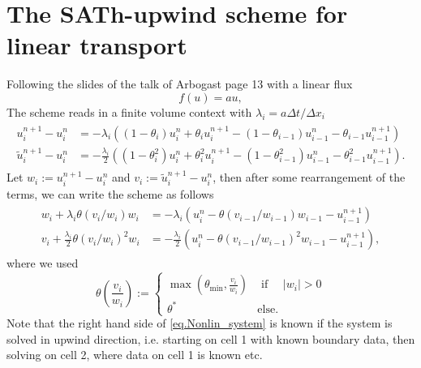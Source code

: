 \documentclass[3p]{scrartcl}%
\begin{document}
    \section{The SATh-upwind scheme for linear transport}
    Following the slides of the talk of Arbogast page 13 with a linear flux
    \begin{equation}
        f(u) = a u,
    \end{equation}
    The scheme reads in a finite volume context with $\lambda_i = a\Delta t/\Delta x_i$
    \begin{align}
\begin{split}
            u_i^{n+1} - u_i^n &= - \lambda_i \left((1-\theta_i) u_i^n + \theta_i u_i^{n+1} - (1-\theta_{i-1})u_{i-1}^n - \theta_{i-1} u_{i-1}^{n+1}\right) \\
        \tilde u_i^{n+1} - u_i^n &= - \frac{\lambda_i}{2} \left((1-\theta_i^2) u_i^n + \theta_i^2 u_i^{n+1} - (1-\theta_{i-1}^2)u_{i-1}^n - \theta_{i-1}^2 u_{i-1}^{n+1}\right).
\end{split}
    \end{align}
    Let $w_i := u_i^{n+1} - u_i^n$ and $v_i := \tilde{u}_i^{n+1}-u_i^n$, then after some rearrangement of the terms, we can write the scheme as follows
    \begin{align}
        \label{eq.Nonlin_system}
        \begin{split}
            w_i + \lambda_i \theta(v_i/w_i) w_i &= - \lambda_i \left(u_i^n - \theta(v_{i-1}/w_{i-1})w_{i-1} - u_{i-1}^{n+1}\right)\\
        v_i + \frac{\lambda_i}{2} \theta(v_i/w_i)^2 w_i &= - \frac{\lambda_i}{2} \left(u_i^n - \theta(v_{i-1}/w_{i-1})^2w_{i-1} - u_{i-1}^{n+1}\right),
        \end{split}
    \end{align}
    where we used
    \begin{equation}
        \label{eq.Theta}
        \theta\left(\frac{v_i}{w_i}\right):= \begin{cases}
            \max\left(\theta_{\min},\frac{v_i}{w_i}\right) & \text{ if }\quad |w_i| > 0\\
            \theta^\ast & \text{else.}
        \end{cases}
    \end{equation}
    Note that the right hand side of \eqref{eq.Nonlin_system} is known if the system is solved in upwind direction, i.e. starting on cell 1 with known boundary data, then solving on cell 2, where data on cell 1 is known etc.
\end{document}

